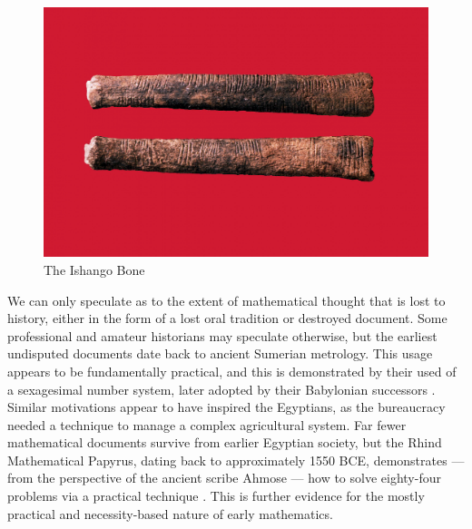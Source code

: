 \documentclass[12pt]{article}
\begin{document}
\begin{figure}
	\includegraphics[scale=0.3]{ishango.png}
	\centering
	\caption{The Ishango Bone \cite{ishango}}
	\label{fig1}
\end{figure}

We can only speculate
as to the extent of mathematical thought
that is lost to history,
either in the form of a lost oral tradition
or destroyed document.
Some professional and amateur historians
may speculate otherwise,
but the earliest undisputed documents
date back to ancient Sumerian metrology.
This usage appears to be fundamentally practical,
and this is demonstrated by their used of
a sexagesimal number system,
later adopted by their Babylonian successors \cite{boyer1991}.
Similar motivations appear to have inspired the Egyptians,
as the bureaucracy needed a technique
to manage a complex agricultural system.
Far fewer mathematical documents survive
from earlier Egyptian society,
but the Rhind Mathematical Papyrus,
dating back to approximately 1550 BCE,
demonstrates --- from the perspective of
the ancient scribe Ahmose ---
how to solve eighty-four problems
via a practical technique \cite{rhind}.
This is further evidence for the mostly
practical and necessity-based nature
of early mathematics.



\end{document}
